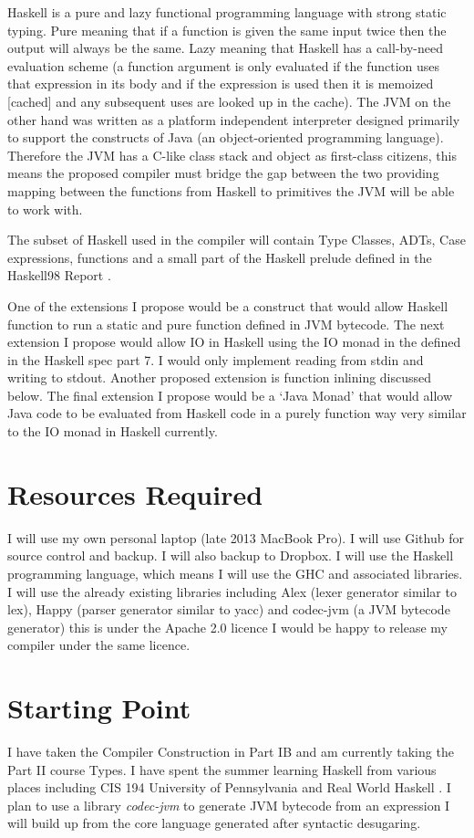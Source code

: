 \documentclass[a4paper]{article}
\begin{document}
  Haskell is a pure and lazy functional programming language with strong static typing. Pure meaning that
  if a function is given the same input twice then the output will always be the same. Lazy meaning that Haskell has a 
  call-by-need evaluation scheme (a function argument is only evaluated if the function uses that expression in its body
  and if the expression is used then it is memoized [cached] and any subsequent uses are looked up in the cache).
  The JVM on the other hand was  written as a platform independent interpreter designed 
  primarily to support the constructs of Java (an object-oriented programming language). 
  Therefore the JVM has a C-like class stack and object as first-class citizens, this means
  the proposed compiler must bridge the gap between the two providing mapping between the functions from Haskell to primitives
  the JVM will be able to work with.

  The subset of Haskell used in the compiler will contain Type Classes, ADTs, Case expressions, 
  functions and a small part of the Haskell prelude defined in the Haskell98 Report  \cite{haskell98-spec}. 

  One of the extensions I propose would be a construct that would allow Haskell function to run a static and pure function defined in JVM bytecode. 
  The next extension I propose would allow IO in Haskell using the IO monad in the defined in the Haskell spec part 7. I would only implement reading from stdin
  and writing to stdout. Another proposed extension is function inlining discussed below.
  The final extension I propose would be a `Java Monad' that would allow Java code to be evaluated from Haskell code in a
  purely function way very similar to the IO monad in Haskell currently. 

\section*{Resources Required}
  I will use my own personal laptop (late 2013 MacBook Pro).
  I will use Github for source control and backup. I will also backup to Dropbox.
  I will use the Haskell programming language, which means I will use the GHC and associated libraries.
  I will use the already existing libraries including Alex (lexer generator similar to lex),
  Happy (parser generator similar to yacc) and codec-jvm (a JVM bytecode generator) this is under the Apache 2.0 licence I would be happy to release my
  compiler under the same licence.

\section*{Starting Point}
  I have taken the Compiler Construction in Part IB and am currently taking the Part II course Types. I have spent the summer
  learning Haskell from various places including CIS 194 University of Pennsylvania \cite{cis194} and Real World Haskell \cite{realwordhaskell}.
  I plan to use a library \textit{codec-jvm} to generate JVM bytecode from an expression I will build up from the core language generated after 
  syntactic desugaring.
\end{document}

